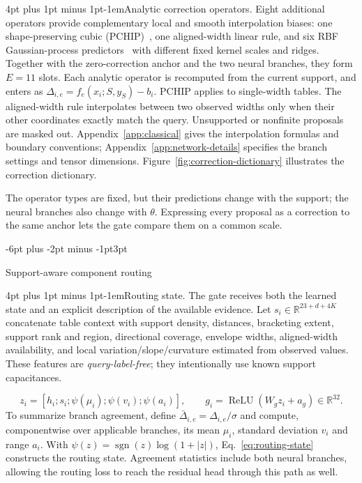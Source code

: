 \documentclass{article}
\makeatletter
\renewcommand{\subsection}{\@startsection{subsection}{2}{\z@}
  {-6pt plus -2pt minus -1pt}{3pt}{\normalsize\sc\raggedright}}
\renewcommand{\paragraph}{\@startsection{paragraph}{4}{\z@}
  {4pt plus 1pt minus 1pt}{-1em}{\normalsize\bf}}
\makeatother
\begin{document}
\paragraph{Analytic correction operators.}
\label{sec:dictionary}
Eight additional operators provide complementary local and smooth interpolation
biases: one shape-preserving cubic (PCHIP)~\cite{pchip}, one aligned-width
linear rule, and six RBF Gaussian-process predictors~\cite{gpml} with different
fixed kernel scales and ridges. Together with the zero-correction anchor and
the two neural branches, they form $E=11$ slots. Each analytic operator is
recomputed from the current support, and enters as
$\Delta_{i,e}=f_e(x_i;S,y_S)-b_i$.
PCHIP applies to single-width tables. The aligned-width rule interpolates
between two observed widths only when their other coordinates exactly match
the query. Unsupported or nonfinite proposals are masked out.
Appendix~\ref{app:classical} gives the interpolation formulas and boundary
conventions; Appendix~\ref{app:network-details} specifies the branch settings
and tensor dimensions. Figure~\ref{fig:correction-dictionary} illustrates the
correction dictionary.

The operator types are fixed, but their predictions change with the support;
the neural branches also change with $\theta$. Expressing every proposal as a
correction to the same anchor lets the gate compare them on a common scale.



\subsection{Support-aware component routing}
\label{sec:gate}

\paragraph{Routing state.}
The gate receives both the learned state and an explicit description of the
available evidence. Let $s_i\in\mathbb{R}^{23+d+4K}$ concatenate table context
with support density, distances, bracketing extent, support rank and region,
directional coverage, envelope widths, aligned-width availability, and local
variation/slope/curvature estimated from observed values. These features are
\emph{query-label-free}; they intentionally use known support capacitances.

\begin{equation}
\label{eq:routing-state}
 z_i=[h_i;s_i;\psi(\mu_i);\psi(v_i);\psi(a_i)],\qquad
 g_i=\operatorname{ReLU}(W_gz_i+a_g)\in\mathbb{R}^{32}.
\end{equation}
To summarize branch agreement, define $\bar\Delta_{i,e}=\Delta_{i,e}/\sigma$
and compute, componentwise over applicable branches, its mean $\mu_i$,
standard deviation $v_i$ and range $a_i$. With
$\psi(z)=\operatorname{sgn}(z)\log(1+|z|)$, Eq.~\eqref{eq:routing-state}
constructs the routing state.
Agreement statistics include both neural branches, allowing the routing loss
to reach the residual head through this path as well.
\end{document}
